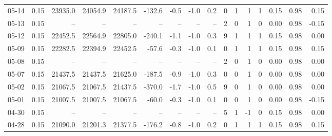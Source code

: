 \begin{threeparttable}
{\begin{tabular}{lrrrrrrrrrrrrrrr}
  05-14 &     0.15 & 23935.0 & 24054.9 & 24187.5 &     -132.6 &           -0.5 &                     -1.0 &                 0.2 &              0 &         1 &     1 &         1 &       0.15 &      0.98 &           0.15 \\
  05-13 &     0.15 &      -- &      -- &      -- &         -- &             -- &                       -- &                  -- &              2 &         0 &     1 &         0 &       0.00 &      0.98 &          -0.15 \\
  05-12 &     0.15 & 22452.5 & 22564.9 & 22805.0 &     -240.1 &           -1.1 &                     -1.0 &                 0.3 &              9 &         1 &     1 &         1 &       0.15 &      0.98 &           0.00 \\
  05-09 &     0.15 & 22282.5 & 22394.9 & 22452.5 &      -57.6 &           -0.3 &                     -1.0 &                 0.1 &              0 &         1 &     1 &         1 &       0.15 &      0.98 &           0.15 \\
  05-08 &     0.15 &      -- &      -- &      -- &         -- &             -- &                       -- &                  -- &              2 &         0 &     1 &         0 &       0.00 &      0.98 &           0.00 \\
  05-07 &     0.15 & 21437.5 & 21437.5 & 21625.0 &     -187.5 &           -0.9 &                     -1.0 &                 0.3 &              0 &         0 &     1 &         0 &       0.00 &      0.98 &           0.00 \\
  05-02 &     0.15 & 21067.5 & 21067.5 & 21437.5 &     -370.0 &           -1.7 &                     -1.0 &                 0.5 &              9 &         0 &     1 &         0 &       0.00 &      0.98 &           0.00 \\
  05-01 &     0.15 & 21007.5 & 21007.5 & 21067.5 &      -60.0 &           -0.3 &                     -1.0 &                 0.1 &              0 &         0 &     1 &         0 &       0.00 &      0.98 &          -0.15 \\
  04-30 &     0.15 &      -- &      -- &      -- &         -- &             -- &                       -- &                  -- &              5 &         1 &    -1 &         0 &       0.15 &      0.98 &           0.00 \\
  04-28 &     0.15 & 21090.0 & 21201.3 & 21377.5 &     -176.2 &           -0.8 &                     -1.0 &                 0.2 &              0 &         1 &     1 &         1 &       0.15 &      0.98 &           0.15 \\

\end{tabular}}
\end{threeparttable}
